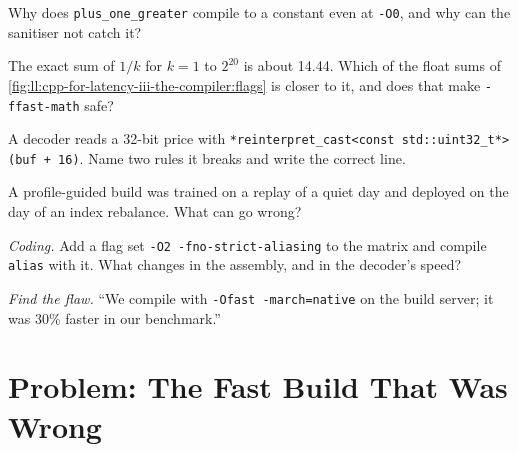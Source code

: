 \begin{exercise}[$\star$]\label{exo:ll:cpp-for-latency-iii-the-compiler:3}
Why does \texttt{plus\_one\_greater} compile to a constant even at \texttt{-O0}, and why can the sanitiser not catch it?
\end{exercise}

\begin{exercise}[$\star\star$]\label{exo:ll:cpp-for-latency-iii-the-compiler:4}
The exact sum of $1/k$ for $k = 1$ to $2^{20}$ is about 14.44. Which of the float sums of
\cref{fig:ll:cpp-for-latency-iii-the-compiler:flags} is closer to it, and does that make \texttt{-ffast-math} safe?
\end{exercise}

\begin{exercise}[$\star\star$]\label{exo:ll:cpp-for-latency-iii-the-compiler:5}
A decoder reads a 32-bit price with \texttt{*reinterpret\_cast<const std::uint32\_t*>(buf + 16)}. Name two rules it breaks
and write the correct line.
\end{exercise}

\begin{exercise}[$\star\star$]\label{exo:ll:cpp-for-latency-iii-the-compiler:6}
A profile-guided build was trained on a replay of a quiet day and deployed on the day of an index rebalance. What can go
wrong?
\end{exercise}

\begin{exercise}[$\star\star\star$]\label{exo:ll:cpp-for-latency-iii-the-compiler:7}
\emph{Coding.} Add a flag set \texttt{-O2 -fno-strict-aliasing} to the matrix and compile \texttt{alias} with it. What
changes in the assembly, and in the decoder's speed?
\end{exercise}

\begin{exercise}[$\star\star\star$]\label{exo:ll:cpp-for-latency-iii-the-compiler:8}
\emph{Find the flaw.} ``We compile with \texttt{-Ofast -march=native} on the build server; it was 30\% faster in our
benchmark.''
\end{exercise}

\section{Problem: The Fast Build That Was Wrong}


